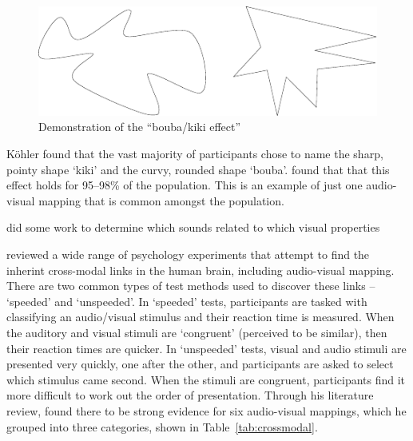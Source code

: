 \begin{figure}[ht]
\centering
  \centering
  \includegraphics[width=0.8\linewidth]{figs/bouba-kiki.pdf}
  \caption{Demonstration of the ``bouba/kiki effect'' \citep{Ramachandran2001}}
  \label{fig:boubakiki}
\end{figure}

K\"{o}hler found that the vast majority of participants chose to name the sharp, pointy shape `kiki' and the curvy,
rounded shape `bouba'. \citet{Ramachandran2001} found that that this effect holds for 95--98\% of the population. This
is an example of just one audio-visual mapping that is common amongst the population.

\citep{Hubbard1996} did some work to determine which sounds related to which visual properties


\citet{Spence2011} reviewed a wide range of psychology experiments that attempt to find the inherint cross-modal links
in the human brain, including audio-visual mapping.  There are two common types of test methods used to discover these
links -- `speeded' and `unspeeded'.  In `speeded' tests, participants are tasked with classifying an audio/visual
stimulus and their reaction time is measured. When the auditory and visual stimuli are `congruent' (perceived to be
similar), then their reaction times are quicker. In `unspeeded' tests, visual and audio stimuli are presented very
quickly, one after the other, and participants are asked to select which stimulus came second. When the stimuli are
congruent, participants find it more difficult to work out the order of presentation.
Through his literature review, \citet{Spence2011} found there to be strong evidence for six audio-visual mappings,
which he grouped into three categories, shown in Table~\ref{tab:crossmodal}.

